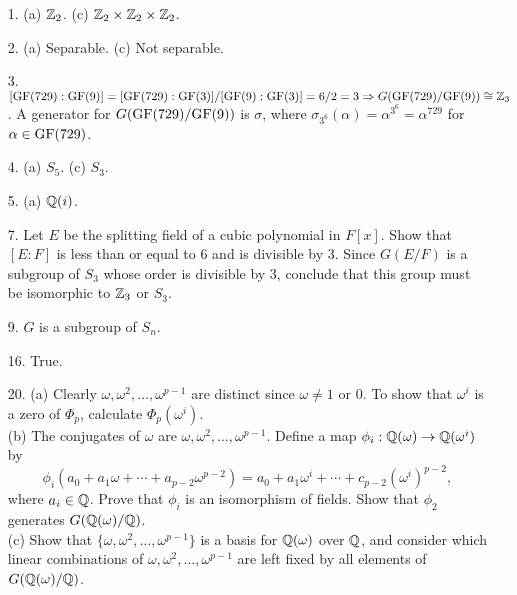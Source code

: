 {\small
\begin{itemize}
 
\item[1.]
(a) ${\Bbb Z}_2$.
(c) ${\Bbb Z}_2 \times {\Bbb Z}_2 \times {\Bbb Z}_2$.
 
\item[2.]
(a) Separable.
(c) Not separable.
 
\item[3.]
$[{\rm GF}(729): {\rm GF}(9)] = [{\rm GF}(729): {\rm GF}(3)] /[{\rm
GF}(9): {\rm GF}(3)] = 6/2 = 3 \Rightarrow G({\rm GF}(729)/ {\rm
GF}(9)) \cong {\Bbb Z}_3$. A generator for $G({\rm GF}(729)/ {\rm
GF}(9))$ is $\sigma$, where $\sigma_{3^6}( \alpha) = \alpha^{3^6} =
\alpha^{729}$ for $\alpha \in {\rm GF}(729)$.

\item[4.]
(a) $S_5$.
(c) $S_3$.

\item[5.]
(a) ${\Bbb Q}(i)$.


\item[7.]
Let $E$ be the splitting field of a cubic polynomial in $F[x]$. Show that
\mbox{$[E:F]$} is less than or equal to 6 and is divisible by 3. Since $G(E/F)$ is a subgroup of
$S_3$ whose order is divisible by 3, conclude that this group must be 
isomorphic to ${\Bbb Z}_3$ or $S_3$.
 
\item[9.]
$G$ is a subgroup of $S_n$.

\item[16.]
True.

\item[20.]
(a) Clearly $\omega, \omega^2, \ldots, \omega^{p-1}$ are
distinct since $\omega \neq 1$ or 0. To show that $\omega^i$ is a zero
of $\Phi_p$, calculate $\Phi_p( \omega^i)$. \\
(b) The conjugates of $\omega$ are $\omega, \omega^2, \ldots,
\omega^{p-1}$. Define a map  $\phi_i: {\Bbb Q}(\omega)
\rightarrow {\Bbb Q}(\omega^i)$ by 
\[
\phi_i(a_0 + a_1 \omega +
\cdots + a_{p-2} \omega^{p-2}) = a_0 + a_1 \omega^i + \cdots + c_{p-2} 
(\omega^i)^{p-2},
\]
where $a_i \in {\Bbb Q}$. Prove that $\phi_i$ is an isomorphism of
fields. Show that $\phi_2$ 
generates $G({\Bbb Q}(\omega)/{\Bbb Q})$. \\ 
(c)
Show that $\{ \omega, \omega^2, \ldots, \omega^{p-1} \}$ is a basis
for ${\Bbb Q}( \omega )$ over ${\Bbb Q}$, and consider which linear
combinations of $\omega, \omega^2, \ldots, \omega^{p-1}$ are left
fixed by all elements of $G( {\Bbb Q}( \omega ) / {\Bbb Q})$.
 
 
 
\end{itemize}
}
 
 
 
 
\pagestyle{headings}
 
 
 
 
